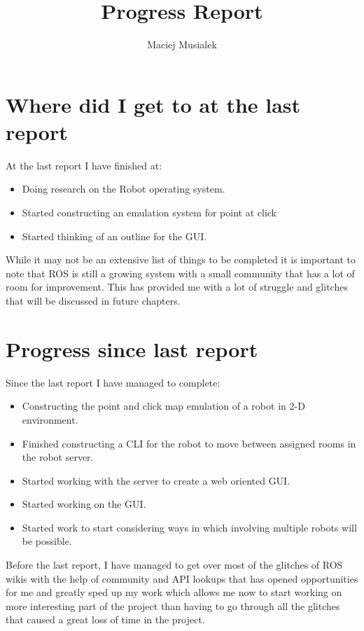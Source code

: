 \documentclass{report}
\begin{document}
  
  \title{Progress Report}
  \author{Maciej Musialek}
  \maketitle

 	\chapter{Where did I get to at the last report}
 	At the last report I have finished at:
 	\begin{itemize}
  	  \item Doing research on the Robot operating system.
  	  \item Started constructing an emulation system for point at click
  	  \item Started thinking of an outline for the GUI.
	\end{itemize}
	While it may not be an extensive list of things to be completed it is important to note that ROS is still a growing system with a small community that has a lot of room for improvement. This has provided me with a lot of struggle and glitches that will be discussed in future chapters.

 	\chapter{Progress since last report}
 	Since the last report I have managed to complete:

 	\begin{itemize}
  	  \item Constructing the point and click map emulation of a robot in 2-D environment.
  	  \item Finished constructing a CLI for the robot to move between assigned rooms in the robot server.
  	  \item Started working with the server to create a web oriented GUI.
  	  \item Started working on the GUI.
  	  \item Started work to start considering ways in which involving multiple robots will be possible.
	\end{itemize}

	Before the last report, I have managed to get over most of the glitches of ROS wikis with the help of community and API lookups that has opened opportunities for me and greatly sped up my work which allows me now to start working on more interesting part of the project than having to go through all the glitches that caused a great loss of time in the project.
\end{document}
